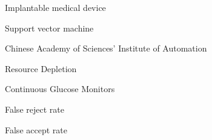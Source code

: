%

\begin{description}[CABR]
\item[IMD] {Implantable medical device}
\item[SVM]{Support vector machine}
\item[CASIA]{Chinese Academy of Sciences' Institute of Automation}
\item[RD]{Resource Depletion}
\item[CGMS]{Continuous Glucose Monitors}
\item[FRR]{False reject rate}
\item[FAR]{False accept rate}
\item[]{               }
\end{description}
